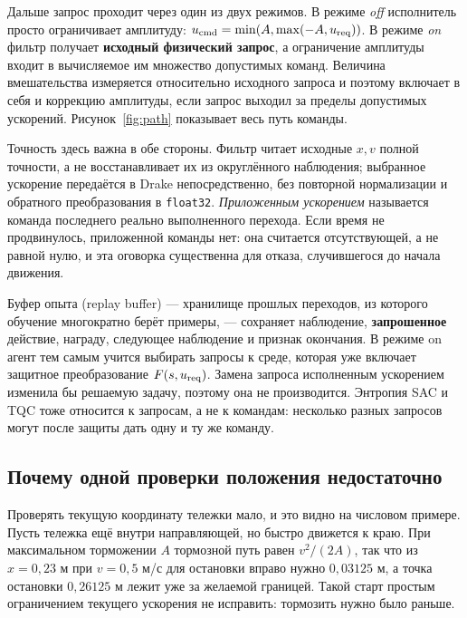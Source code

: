 Дальше запрос проходит через один из двух режимов. В режиме \emph{off} исполнитель просто ограничивает амплитуду: $u_{\rm cmd}=\min(A,\max(-A,u_{\rm req}))$. В режиме \emph{on} фильтр получает \textbf{исходный физический запрос}, а ограничение амплитуды входит в вычисляемое им множество допустимых команд. Величина вмешательства измеряется относительно исходного запроса и поэтому включает в себя и коррекцию амплитуды, если запрос выходил за пределы допустимых ускорений. Рисунок~\ref{fig:path} показывает весь путь команды.

Точность здесь важна в обе стороны. Фильтр читает исходные $x,v$ полной точности, а не восстанавливает их из округлённого наблюдения; выбранное ускорение передаётся в Drake непосредственно, без повторной нормализации и обратного преобразования в \texttt{float32}. \emph{Приложенным ускорением} называется команда последнего реально выполненного перехода. Если время не продвинулось, приложенной команды нет: она считается отсутствующей, а не равной нулю, и эта оговорка существенна для отказа, случившегося до начала движения.

Буфер опыта (replay buffer) — хранилище прошлых переходов, из которого обучение многократно берёт примеры, — сохраняет наблюдение, \textbf{запрошенное} действие, награду, следующее наблюдение и признак окончания. В режиме on агент тем самым учится выбирать запросы к среде, которая уже включает защитное преобразование $F(s,u_{\rm req})$. Замена запроса исполненным ускорением изменила бы решаемую задачу, поэтому она не производится. Энтропия SAC и TQC тоже относится к запросам, а не к командам: несколько разных запросов могут после защиты дать одну и ту же команду.

\subsection{Почему одной проверки положения недостаточно}
Проверять текущую координату тележки мало, и это видно на числовом примере. Пусть тележка ещё внутри направляющей, но быстро движется к краю. При максимальном торможении $A$ тормозной путь равен $v^2/(2A)$, так что из $x=0{,}23$ м при $v=0{,}5$ м/с для остановки вправо нужно $0{,}03125$ м, а точка остановки $0{,}26125$ м лежит уже за желаемой границей. Такой старт простым ограничением текущего ускорения не исправить: тормозить нужно было раньше.

